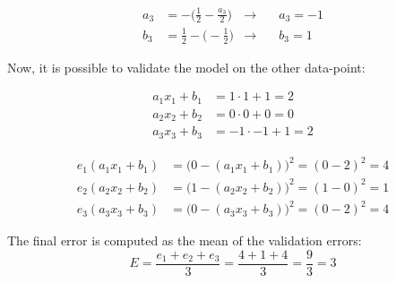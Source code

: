 {\begin{itemize}
		\begin{align*}
		a_3 &= - \bigg(\frac{1}{2} - \frac{a_3}{2}\bigg) &\rightarrow &\quad 
		a_3 = -1\\
		b_3 &= \frac{1}{2} -\bigg(-\frac{1}{2}\bigg) &\rightarrow& \quad b_3 = 1
		\end{align*}

		
		Now, it is possible to validate the model on the other data-point:
		
		\begin{align*}
		a_1x_1+b_1 & =  1 \cdot 1 + 1 = 2   \\
		a_2x_2+b_2 & =  0 \cdot 0 + 0 = 0   \\
		a_3x_3+b_3 & = -1 \cdot -1 + 1 = 2
		\end{align*}
		
		
		\begin{align*}
		e_1(a_1x_1+b_1) & = \big(0-(a_1x_1+b_1)\big)^2 = (0-2)^2 = 4\\
		e_2(a_2x_2+b_2) & = \big(1-(a_2x_2+b_2)\big)^2 = (1-0)^2 = 1\\
		e_3(a_3x_3+b_3) & = \big(0-(a_3x_3+b_3)\big)^2 = (0-2)^2 = 4
		\end{align*}
		
		The final error is computed as the mean of the validation errors: 
		\begin{equation*}
		E=\frac{e_1+e_2+e_3}{3}=\frac{4+1+4}{3}=\frac{9}{3}=3
		\end{equation*}
		
	\end{itemize}
}